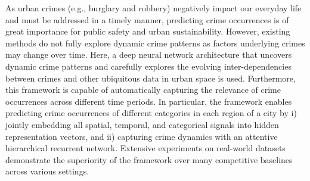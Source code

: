 As urban crimes (e.g., burglary and robbery) negatively impact our
everyday life and must be addressed in a timely manner, predicting crime occurrences is of great importance for public safety and
urban sustainability. However, existing methods do not fully explore dynamic crime patterns as factors underlying crimes may
change over time. Here, a deep neural network architecture that
uncovers dynamic crime patterns and carefully explores the evolving inter-dependencies between crimes and other ubiquitous data
in urban space is used. Furthermore, this framework is capable of automatically capturing the relevance of crime occurrences
across different time periods. In particular, the framework enables predicting crime occurrences of different categories
in each region of a city by i) jointly embedding all spatial, temporal,
and categorical signals into hidden representation vectors, and ii)
capturing crime dynamics with an attentive hierarchical recurrent
network. Extensive experiments on real-world datasets demonstrate the superiority of the framework over many competitive baselines across various settings.